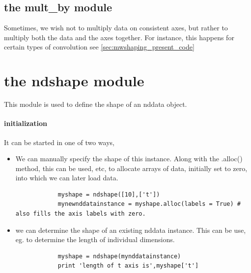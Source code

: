 \subsection{the mult\_by module}
Sometimes, we wish not to multiply data on consistent axes,
    but rather to multiply both the data and the axes together.
For instance, this happens for certain types of convolution
    see \ref{sec:mwshaping_present_code}
\section{the ndshape module}
This module is used to define the shape of an nddata object.
\paragraph{initialization}
It can be started in one of two ways,
\begin{itemize}
    \item We can manually specify the shape of this instance.
        Along with the .alloc() method, this can be used, etc, to allocate arrays of data, initially set to zero, into which we can later load data.
        \begin{lstlisting}
            myshape = ndshape([10],['t'])
            mynewnddatainstance = myshape.alloc(labels = True) # also fills the axis labels with zero.
        \end{lstlisting}
    \item we can determine the shape of an existing nddata instance.
        This can be use, eg. to determine the length of individual dimensions.
        \begin{lstlisting}
            myshape = ndshape(mynddatainstance)
            print 'length of t axis is',myshape['t']
        \end{lstlisting}
\end{itemize}
